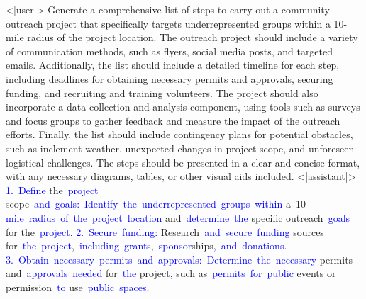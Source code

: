 \documentclass{article}
\begin{document}
\begin{tcolorbox}[colframe=black,colback=white]
<|user|>
Generate a comprehensive list of steps to carry out a community outreach project that specifically targets underrepresented groups within a 10-mile radius of the project location. The outreach project should include a variety of communication methods, such as flyers, social media posts, and targeted emails. Additionally, the list should include a detailed timeline for each step, including deadlines for obtaining necessary permits and approvals, securing funding, and recruiting and training volunteers. The project should also incorporate a data collection and analysis component, using tools such as surveys and focus groups to gather feedback and measure the impact of the outreach efforts. Finally, the list should include contingency plans for potential obstacles, such as inclement weather, unexpected changes in project scope, and unforeseen logistical challenges. The steps should be presented in a clear and concise format, with any necessary diagrams, tables, or other visual aids included.
<|assistant|>
\textcolor{blue}{1}\textcolor{blue}{.}\textcolor{blue}{~Define} the\textcolor{blue}{~project} scope\textcolor{blue}{~and}\textcolor{blue}{~goals}\textcolor{blue}{:}\textcolor{blue}{~Identify}\textcolor{blue}{~the}\textcolor{blue}{~under}\textcolor{blue}{represented}\textcolor{blue}{~groups}\textcolor{blue}{~within} a\textcolor{blue}{~}10\textcolor{blue}{-mile}\textcolor{blue}{~radius}\textcolor{blue}{~of}\textcolor{blue}{~the}\textcolor{blue}{~project}\textcolor{blue}{~location} and\textcolor{blue}{~determine}\textcolor{blue}{~the} specific outreach\textcolor{blue}{~goals} for the\textcolor{blue}{~project}.
\textcolor{blue}{2}\textcolor{blue}{.}\textcolor{blue}{~Secure}\textcolor{blue}{~funding}\textcolor{blue}{:} Research\textcolor{blue}{~and}\textcolor{blue}{~secure}\textcolor{blue}{~funding} sources for\textcolor{blue}{~the}\textcolor{blue}{~project},\textcolor{blue}{~including}\textcolor{blue}{~grants},\textcolor{blue}{~sponsor}ships\textcolor{blue}{,}\textcolor{blue}{~and}\textcolor{blue}{~donations}\textcolor{blue}{.
}\textcolor{blue}{3}\textcolor{blue}{.}\textcolor{blue}{~Obtain}\textcolor{blue}{~necessary}\textcolor{blue}{~permits}\textcolor{blue}{~and}\textcolor{blue}{~approvals}\textcolor{blue}{:}\textcolor{blue}{~Determine}\textcolor{blue}{~the}\textcolor{blue}{~necessary} permits and\textcolor{blue}{~approvals}\textcolor{blue}{~needed} for\textcolor{blue}{~the} project\textcolor{blue}{,} such as\textcolor{blue}{~permits}\textcolor{blue}{~for}\textcolor{blue}{~public} events or permission\textcolor{blue}{~to} use\textcolor{blue}{~public}\textcolor{blue}{~spaces}.

\end{tcolorbox}
\end{document}
